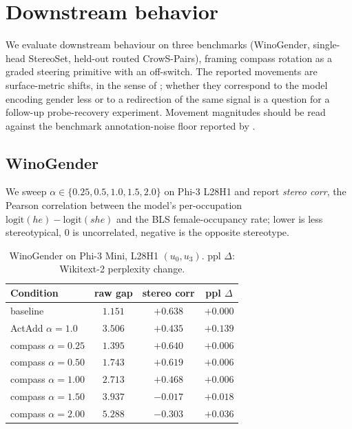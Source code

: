 \section{Downstream behavior}
\label{sec:downstream}

We evaluate downstream behaviour on three benchmarks (WinoGender,
single-head StereoSet, held-out routed CrowS-Pairs), framing
compass rotation as a graded steering primitive with an
off-switch. The reported movements are surface-metric shifts, in
the sense of \citet{gonen2019lipstick}; whether they correspond to
the model encoding gender less or to a redirection of the same
signal is a question for a follow-up probe-recovery experiment.
Movement magnitudes should be read against the benchmark
annotation-noise floor reported by \citet{blodgett2021stereotyping}.

\subsection{WinoGender}
\label{sec:downstream:winogender}

We sweep $\alpha \in \{0.25, 0.5, 1.0, 1.5, 2.0\}$ on Phi-3 L28H1 and
report \emph{stereo corr}, the Pearson correlation between the
model's per-occupation
$\mathrm{logit}(\mathit{he}) - \mathrm{logit}(\mathit{she})$ and the
BLS female-occupancy rate; lower is less stereotypical, $0$ is
uncorrelated, negative is the opposite stereotype.

\begin{table}[t]
\centering
\small
\caption{WinoGender on Phi-3 Mini, L28H1 $(u_0, u_3)$. ppl $\Delta$:
Wikitext-2 perplexity change.}
\label{tab:winogender}
\begin{tabular}{lccc}
\toprule
Condition & raw gap & stereo corr & ppl $\Delta$ \\
\midrule
baseline                & $1.151$ & $+0.638$ & $+0.000$ \\
ActAdd $\alpha{=}1.0$   & $3.506$ & $+0.435$ & $+0.139$ \\
compass $\alpha{=}0.25$ & $1.395$ & $+0.640$ & $+0.006$ \\
compass $\alpha{=}0.50$ & $1.743$ & $+0.619$ & $+0.006$ \\
compass $\alpha{=}1.00$ & $2.713$ & $+0.468$ & $+0.006$ \\
compass $\alpha{=}1.50$ & $3.937$ & $-0.017$ & $+0.018$ \\
compass $\alpha{=}2.00$ & $5.288$ & $-0.303$ & $+0.036$ \\
\bottomrule
\end{tabular}
\end{table}

